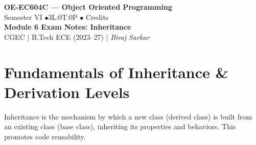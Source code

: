 \documentclass[12pt,a4paper]{article}
\begin{document}

\begin{center}
  {\LARGE\bfseries\color{myred} OE-EC604C --- Object Oriented Programming}\\[5pt]
  {\normalsize\color{mydark} Semester VI \quad$\bullet$\quad 3L:0T:0P \quad$\bullet$ Credits}\\[3pt]
  {\normalsize\color{myteal}\textbf{Module 6 Exam Notes: Inheritance}}\\[3pt]
  {\small\color{mydark} CGEC \;$|$\; B.Tech ECE (2023--27) \;$|$\; \textit{Biraj Sarkar}}
\end{center}
\vspace{2pt}
\noindent{\color{myred}\rule{\linewidth}{1.5pt}}
\vspace{2pt}

\hypersetup{linkcolor=mydark}
\tableofcontents
\hypersetup{linkcolor=myteal}
\newpage

\section{Fundamentals of Inheritance \& Derivation Levels}

Inheritance is the mechanism by which a new class (derived class) is built from an existing class (base class), inheriting its properties and behaviors. This promotes code reusability.
\end{document}
